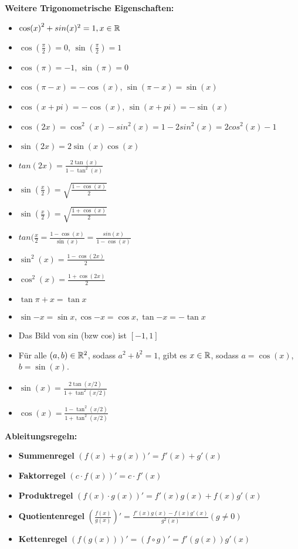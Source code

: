 \textbf{Weitere Trigonometrische Eigenschaften: }\\
\begin{itemize}
    \item $\cos(x)^2 + sin(x)^2 = 1, x\in\mathbb{R}$
    \item $\cos(\frac{\pi}{2}) = 0$,  $\sin(\frac{\pi}{2}) = 1$
    \item $\cos(\pi) = -1$, $\sin(\pi) = 0$
    \item $\cos(\pi-x) = -\cos(x)$, $\sin(\pi-x) = \sin(x)$
    \item $\cos(x+pi) = -\cos(x)$, $\sin(x+pi) = -\sin(x)$
    \item $\cos(2x) = \cos^2(x) - sin^2(x) = 1-2sin^2(x) = 2cos^2(x) - 1$
    \item $\sin(2x) = 2\sin(x)\cos(x)$
    \item $tan(2x) = \frac{2\tan(x)}{1-\tan^2(x)}$
    \item $\sin(\frac{x}{2}) = \sqrt{\frac{1-\cos(x)}{2}}$
    \item $\sin(\frac{x}{2}) = \sqrt{\frac{1+\cos(x)}{2}}$
    \item $tan(\frac{x}{2} = \frac{1-\cos(x)}{\sin(x)} = \frac{sin(x)}{1-\cos(x)}$
    \item $\sin^2(x) = \frac{1-\cos(2x)}{2}$
    \item $\cos^2(x) = \frac{1+\cos(2x)}{2}$
    \item $\tan{\pi + x} = \tan{x}$
    \item $\sin{-x} = \sin{x}, \cos{-x} = \cos{x}, \tan{-x} = -\tan{x}$
    \item Das Bild von sin (bzw cos) ist $[-1, 1]$
    \item Für alle $(a,b)\in \mathbb{R}^2$, sodass $a^2+b^2 = 1$, gibt es $x\in\mathbb{R}$, sodass $a = \cos(x)$, $b = \sin(x)$.
    \item $\sin(x) = \frac{2\tan(x/2)}{1+\tan^2(x/2)}$
    \item $\cos(x) = \frac{1-\tan^2(x/2)}{1+\tan^2(x/2)}$
\end{itemize}


\textbf{Ableitungsregeln:}
\begin{itemize}
    \item \textbf{Summenregel} $(f(x)+g(x))' = f'(x) + g'(x)$\\
    \item \textbf{Faktorregel} $(c\cdot f(x))' = c\cdot f'(x)$\\
    \item \textbf{Produktregel} $(f(x)\cdot g(x))' = f'(x)g(x) + f(x)g'(x)$\\
    \item \textbf{Quotientenregel} $\left(\frac{f(x)}{g(x)}\right)' = \frac{f'(x)g(x) - f(x)g'(x)}{g^2(x)}(g\neq 0)$ \\
    \item \textbf{Kettenregel} $(f(g(x)))' = (f\circ g)' = f'(g(x))g'(x)$\\
\end{itemize}


